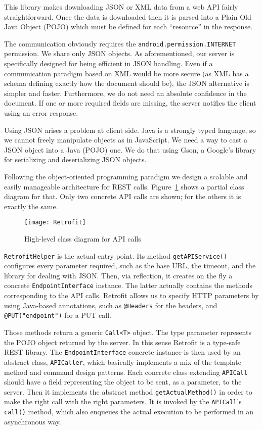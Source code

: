 This library makes downloading JSON or XML data from a web API fairly 
straightforward. Once the data is downloaded then it is parsed into a 
Plain Old Java Object (POJO) which must be defined for each ``resource'' 
in the response.

The communication obviously requires the \texttt{android.permission.INTERNET}
permission. We share only JSON objects. As aforementioned, our server is 
specifically designed for being efficient in JSON handling. Even if a 
communication paradigm based on XML would be more secure (as XML has a schema
defining exactly how the document should be), the JSON alternative is simpler 
and faster. Furthermore, we do not need an absolute confidence in the document. If
one or more required fields are missing, the server notifies the client using an
error response.

Using JSON arises a problem at client side. Java is a strongly typed language, so we
cannot freely manipulate objects as in JavaScript. We need a way to cast a JSON 
object into a Java (POJO) one. We do that using Gson, a Google's library for 
serializing and deserializing JSON objects. 

Following the object-oriented programming paradigm we design a scalable and easily 
manageable architecture for REST calls. Figure~\ref{fig:retrofit} shows a partial
class diagram for that. Only two concrete API calls are shown; for the others it 
is exactly the same.
\begin{figure}[h]
	\centering
	\texttt{[image: Retrofit]}
	\caption{High-level class diagram for API calls}
	\label{fig:retrofit}
\end{figure}

\texttt{RetrofitHelper} is the actual entry point. Its method \texttt{getAPIService()}
configures every parameter required, such as the base URL, the timeout, and the 
library for dealing with JSON. Then, via reflection, it creates on the fly a 
concrete \texttt{EndpointInterface} instance. The latter actually contains the
methods corresponding to the API calls. Retrofit allows us to specify HTTP
parameters by using Java-based annotations, such as \texttt{@Headers} for the
headers, and \texttt{@PUT("endpoint")} for a PUT call. 

Those methods return a generic \texttt{Call<T>} object. The type parameter 
represents the POJO object returned by the server. In this sense Retrofit is a
type-safe REST library. The \texttt{EndpointInterface} concrete instance is then
used by an abstract class, \texttt{APICaller}, which basically implements a mix
of the template method and command design patterns. Each concrete class extending
\texttt{APICall} should have a field representing the object to be sent, 
as a parameter, to the server. Then it implements the abstract method 
\texttt{getActualMethod()} in order to make the right call with the right 
parameters. It is invoked by the \texttt{APICall}'s \texttt{call()} method,
which also enqueues the actual execution to be performed in an asynchronous way. 

